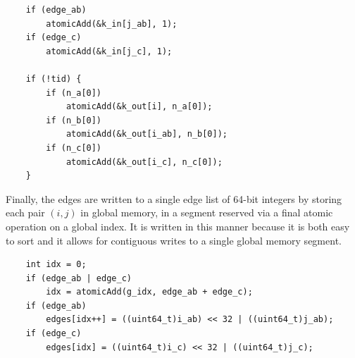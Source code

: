 \documentclass[preprint,notitlepage,amsmath,amssymb,floatfix]{revtex4-1}
\begin{document}
\begin{lstlisting}
	if (edge_ab)
		atomicAdd(&k_in[j_ab], 1);
	if (edge_c)
		atomicAdd(&k_in[j_c], 1);

	if (!tid) {
		if (n_a[0])
			atomicAdd(&k_out[i], n_a[0]);
		if (n_b[0])
			atomicAdd(&k_out[i_ab], n_b[0]);
		if (n_c[0])
			atomicAdd(&k_out[i_c], n_c[0]);
	}
\end{lstlisting}

\noindent Finally, the edges are written to a single edge list of 64-bit integers by storing each pair $(i,j)$ in global memory, in a segment reserved via a final atomic operation on a global index.  
It is written in this manner because it is both easy to sort and it allows for contiguous writes to a single global memory segment.

\begin{lstlisting}
	int idx = 0;
	if (edge_ab | edge_c)
		idx = atomicAdd(g_idx, edge_ab + edge_c);
	if (edge_ab)
		edges[idx++] = ((uint64_t)i_ab) << 32 | ((uint64_t)j_ab);
	if (edge_c)
		edges[idx] = ((uint64_t)i_c) << 32 | ((uint64_t)j_c);
\end{lstlisting}
\end{document}
